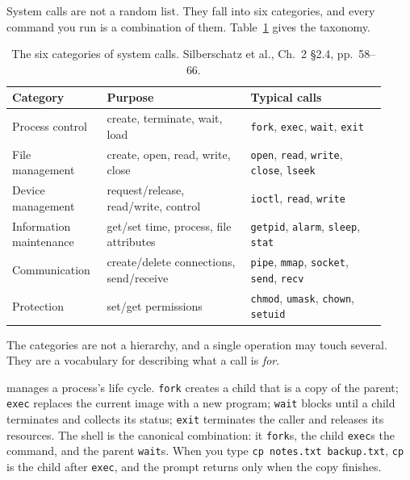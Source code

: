 \documentclass[11pt]{article}
\begin{document}
System calls are not a random list. They fall into six categories, and every command you run is a combination of them. Table~\ref{tab:six-categories} gives the taxonomy.

\begin{table}[h]
\centering
\small
\renewcommand{\arraystretch}{1.25}
\begin{tabular}{@{}>{\raggedright\arraybackslash}p{0.22\linewidth}>{\raggedright\arraybackslash}p{0.36\linewidth}>{\raggedright\arraybackslash}p{0.34\linewidth}@{}}
\toprule
\textbf{Category} & \textbf{Purpose} & \textbf{Typical calls} \\
\midrule
Process control & create, terminate, wait, load &
\texttt{fork}, \texttt{exec}, \texttt{wait}, \texttt{exit} \\
File management & create, open, read, write, close &
\texttt{open}, \texttt{read}, \texttt{write}, \texttt{close}, \texttt{lseek} \\
Device management & request/release, read/write, control &
\texttt{ioctl}, \texttt{read}, \texttt{write} \\
Information maintenance & get/set time, process, file attributes &
\texttt{getpid}, \texttt{alarm}, \texttt{sleep}, \texttt{stat} \\
Communication & create/delete connections, send/receive &
\texttt{pipe}, \texttt{mmap}, \texttt{socket}, \texttt{send}, \texttt{recv} \\
Protection & set/get permissions &
\texttt{chmod}, \texttt{umask}, \texttt{chown}, \texttt{setuid} \\
\bottomrule
\end{tabular}
\caption{The six categories of system calls. Silberschatz et al., Ch.~2 \S2.4, pp.~58--66.}
\label{tab:six-categories}
\end{table}

The categories are not a hierarchy, and a single operation may touch several. They are a vocabulary for describing what a call is \emph{for}.

 manages a process's life cycle. \texttt{fork} creates a child that is a copy of the parent; \texttt{exec} replaces the current image with a new program; \texttt{wait} blocks until a child terminates and collects its status; \texttt{exit} terminates the caller and releases its resources. The shell is the canonical combination: it \texttt{fork}s, the child \texttt{exec}s the command, and the parent \texttt{wait}s. When you type \texttt{cp notes.txt backup.txt}, \texttt{cp} is the child after \texttt{exec}, and the prompt returns only when the copy finishes.
\end{document}
